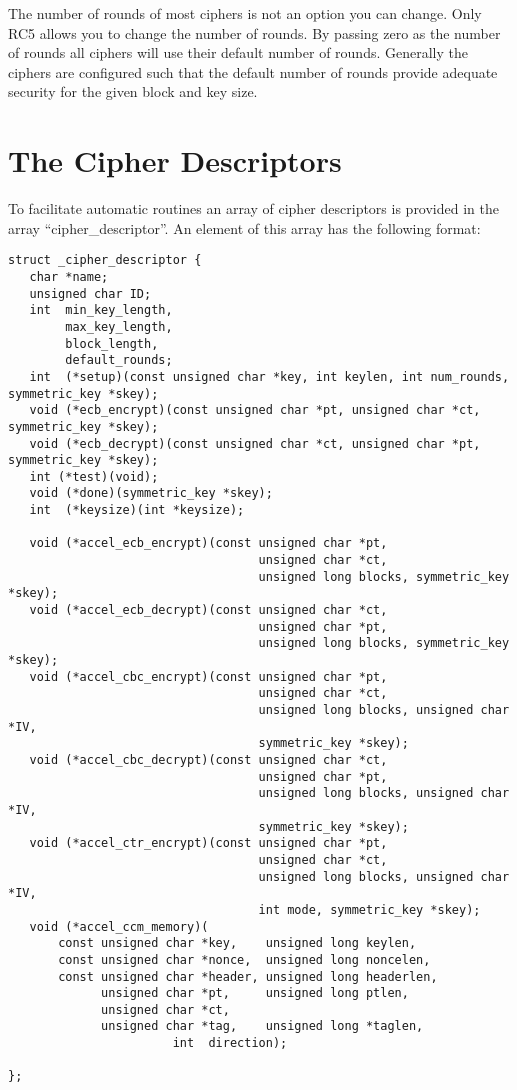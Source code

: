 \documentclass[a4paper]{book}
\begin{document}
The number of rounds of most ciphers is not an option you can change.  Only RC5 allows you to change the number of
rounds.  By passing zero as the number of rounds all ciphers will use their default number of rounds.  Generally the
ciphers are configured such that the default number of rounds provide adequate security for the given block and key 
size.

\section{The Cipher Descriptors}
To facilitate automatic routines an array of cipher descriptors is provided in the array ``cipher\_descriptor''.  An element
of this array has the following format:

\begin{small}
\begin{verbatim}
struct _cipher_descriptor {
   char *name;
   unsigned char ID;
   int  min_key_length, 
        max_key_length, 
        block_length, 
        default_rounds;
   int  (*setup)(const unsigned char *key, int keylen, int num_rounds, symmetric_key *skey);
   void (*ecb_encrypt)(const unsigned char *pt, unsigned char *ct, symmetric_key *skey);
   void (*ecb_decrypt)(const unsigned char *ct, unsigned char *pt, symmetric_key *skey);
   int (*test)(void);
   void (*done)(symmetric_key *skey);      
   int  (*keysize)(int *keysize);

   void (*accel_ecb_encrypt)(const unsigned char *pt, 
                                   unsigned char *ct, 
                                   unsigned long blocks, symmetric_key *skey);
   void (*accel_ecb_decrypt)(const unsigned char *ct, 
                                   unsigned char *pt, 
                                   unsigned long blocks, symmetric_key *skey);
   void (*accel_cbc_encrypt)(const unsigned char *pt, 
                                   unsigned char *ct, 
                                   unsigned long blocks, unsigned char *IV, 
                                   symmetric_key *skey);
   void (*accel_cbc_decrypt)(const unsigned char *ct, 
                                   unsigned char *pt, 
                                   unsigned long blocks, unsigned char *IV, 
                                   symmetric_key *skey);
   void (*accel_ctr_encrypt)(const unsigned char *pt, 
                                   unsigned char *ct, 
                                   unsigned long blocks, unsigned char *IV, 
                                   int mode, symmetric_key *skey);
   void (*accel_ccm_memory)(
       const unsigned char *key,    unsigned long keylen,
       const unsigned char *nonce,  unsigned long noncelen,
       const unsigned char *header, unsigned long headerlen,
             unsigned char *pt,     unsigned long ptlen,
             unsigned char *ct,
             unsigned char *tag,    unsigned long *taglen,
                       int  direction);

};
\end{verbatim}
\end{small}
\end{document}

